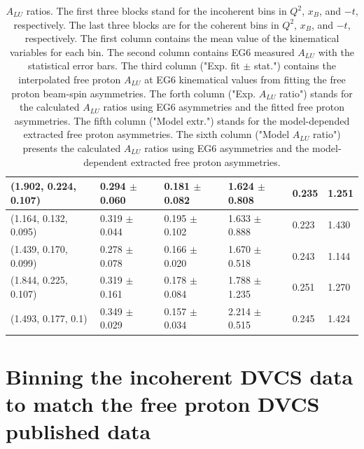 \begin{landscape}
\begin{table}[!h]
\begin{center}
\begin{tabular}{||l|l|l|l|l|l||}
 (1.902, 0.224, 0.107) & 0.294 $\pm$ 0.060 & 0.181 $\pm$ 0.082 & 1.624 $\pm$ 0.808 & 0.235 & 1.251 \\
     \hline \hline  \hline                                                                   
 (1.164, 0.132, 0.095) & 0.319 $\pm$ 0.044 & 0.195 $\pm$ 0.102 & 1.633 $\pm$ 0.888 & 0.223 & 1.430 \\
 (1.439, 0.170, 0.099) & 0.278 $\pm$ 0.078 & 0.166 $\pm$ 0.020 & 1.670 $\pm$ 0.518 & 0.243 & 1.144 \\
 (1.844, 0.225, 0.107) & 0.319 $\pm$ 0.161 & 0.178 $\pm$ 0.084 & 1.788 $\pm$ 1.235 & 0.251 & 1.270 \\
      \hline  \hline  \hline                                                                 
 (1.493, 0.177, 0.1)   & 0.349 $\pm$ 0.029 & 0.157 $\pm$ 0.034 & 2.214 $\pm$ 0.515 & 0.245 & 1.424 \\                                                               
 \hline
 \end{tabular}
 \caption{$A_{LU}$ ratios. The first three blocks stand for the incoherent bins 
 in $Q^{2}$, $x_{B}$, and $-t$, respectively. The last three blocks are for the 
 coherent bins in $Q^{2}$, $x_{B}$, and $-t$, respectively. The first column 
 contains the mean value of the kinematical variables for each bin. The second 
 column contains EG6 measured $A_{LU}$ with the statistical error bars. The 
 third column ("Exp. fit $\pm$ stat.") contains the interpolated free proton 
 $A_{LU}$ at EG6 kinematical values from fitting the free proton beam-spin 
 asymmetries. The forth column ("Exp. $A_{LU}$ ratio") stands for the 
 calculated $A_{LU}$ ratios using EG6 asymmetries and the fitted free proton 
 asymmetries. The fifth column ("Model extr.") stands for the model-depended 
 extracted free proton asymmetries. The sixth column ("Model $A_{LU}$ ratio") 
 presents the calculated $A_{LU}$ ratios using EG6 asymmetries and the 
 model-dependent extracted free proton asymmetries. }
 \label{table:ALU_ratios_}
 \end{center}
\end{table}
\end{landscape}




\chapter{Binning the incoherent DVCS data to match the free proton DVCS 
published data}
 \label{app_free_proton_4D}

